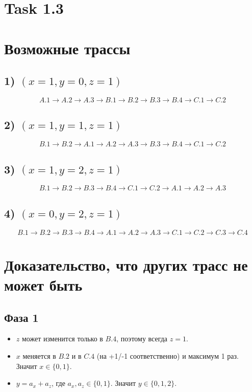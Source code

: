 \documentclass{article}
\begin{document}
\small

\section*{Task 1.3}

\section*{Возможные трассы}

\subsection*{1) $(x=1,y=0,z=1)$}

\[
A.1 \to A.2 \to A.3 \to B.1 \to B.2 \to B.3 \to B.4 \to C.1 \to C.2
\]

\subsection*{2) $(x=1,y=1,z=1)$}

\[
B.1 \to B.2 \to A.1 \to A.2 \to A.3 \to B.3 \to B.4 \to C.1 \to C.2
\]

\subsection*{3) $(x=1,y=2,z=1)$}

\[
B.1 \to B.2 \to B.3 \to B.4 \to C.1 \to C.2 \to A.1 \to A.2 \to A.3
\]

\subsection*{4) $(x=0,y=2,z=1)$}

\[
B.1 \to B.2 \to B.3 \to B.4 \to A.1 \to A.2 \to A.3 \to C.1 \to C.2 \to C.3 \to C.4
\]

\section*{Доказательство, что других трасс не может быть}

\subsection*{Фаза 1}

\begin{itemize}
\item $z$ может изменится только в $B.4$, поэтому всегда $z=1$.
\item $x$ меняется в $B.2$ и в $C.4$ (на +1/-1 соответственно) и максимум 1 раз. Значит $x \in \{0,1\}$.
\item $y=a_x+a_z$, где $a_x,a_z \in \{0,1\}$. Значит $y \in \{0,1,2\}$.
\end{itemize}
\end{document}
